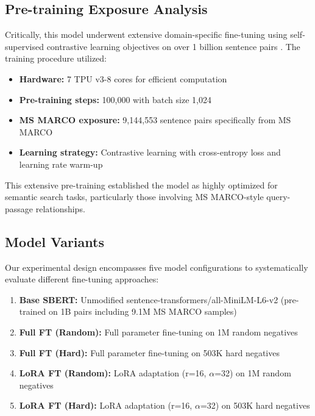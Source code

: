 \subsection{Pre-training Exposure Analysis}

Critically, this model underwent extensive domain-specific fine-tuning using self-supervised contrastive learning objectives \cite{gao2021simcse} on over 1 billion sentence pairs \cite{huggingface_minilm}. The training procedure utilized:

\begin{itemize}
\item \textbf{Hardware:} 7 TPU v3-8 cores for efficient computation
\item \textbf{Pre-training steps:} 100,000 with batch size 1,024
\item \textbf{MS MARCO exposure:} 9,144,553 sentence pairs specifically from MS MARCO
\item \textbf{Learning strategy:} Contrastive learning \cite{gao2021simcse} with cross-entropy loss and learning rate warm-up
\end{itemize}

This extensive pre-training established the model as highly optimized for semantic search tasks, particularly those involving MS MARCO-style query-passage relationships.

\subsection{Model Variants}

Our experimental design encompasses five model configurations to systematically evaluate different fine-tuning approaches:

\begin{enumerate}
\item \textbf{Base SBERT:} Unmodified sentence-transformers/all-MiniLM-L6-v2 (pre-trained on 1B pairs including 9.1M MS MARCO samples)
\item \textbf{Full FT (Random):} Full parameter fine-tuning on 1M random negatives
\item \textbf{Full FT (Hard):} Full parameter fine-tuning on 503K hard negatives
\item \textbf{LoRA FT (Random):} LoRA adaptation (r=16, $\alpha$=32) on 1M random negatives  
\item \textbf{LoRA FT (Hard):} LoRA adaptation (r=16, $\alpha$=32) on 503K hard negatives
\end{enumerate}

